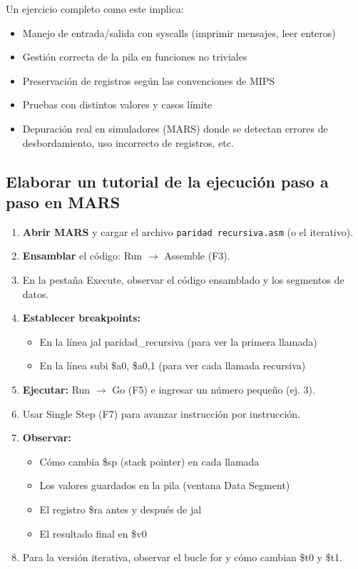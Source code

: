 \documentclass[12pt]{article}
\begin{document}
	Un ejercicio completo como este implica:
	\begin{itemize}
		\item Manejo de entrada/salida con syscalls (imprimir mensajes, leer enteros)
		\item Gestión correcta de la pila en funciones no triviales
		\item Preservación de registros según las convenciones de MIPS
		\item Pruebas con distintos valores y casos límite
		\item Depuración real en simuladores (MARS) donde se detectan errores de desbordamiento, uso incorrecto de registros, etc.
	\end{itemize}
	
	\subsection{Elaborar un tutorial de la ejecución paso a paso en MARS}
	\begin{enumerate}
		\item \textbf{Abrir MARS} y cargar el archivo \texttt{paridad recursiva.asm} (o el iterativo).
		\item \textbf{Ensamblar} el código: Run $\rightarrow$ Assemble (F3).
		\item En la pestaña Execute, observar el código ensamblado y los segmentos de datos.
		\item \textbf{Establecer breakpoints:}
		\begin{itemize}
			\item En la línea jal paridad\_recursiva (para ver la primera llamada)
			\item En la línea subi \$a0, \$a0,1 (para ver cada llamada recursiva)
		\end{itemize}
		\item \textbf{Ejecutar:} Run $\rightarrow$ Go (F5) e ingresar un número pequeño (ej. 3).
		\item Usar Single Step (F7) para avanzar instrucción por instrucción.
		\item \textbf{Observar:}
		\begin{itemize}
			\item Cómo cambia \$sp (stack pointer) en cada llamada
			\item Los valores guardados en la pila (ventana Data Segment)
			\item El registro \$ra antes y después de jal
			\item El resultado final en \$v0
		\end{itemize}
		\item Para la versión iterativa, observar el bucle for y cómo cambian \$t0 y \$t1.
	\end{enumerate}
	
\end{document}
